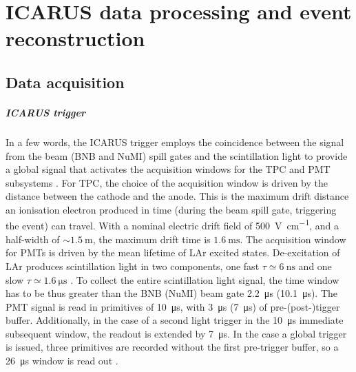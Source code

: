 
\chapter{ICARUS data processing and event reconstruction}
\label{chap:event_reconstruction}




\section{Data acquisition} \label{sec:DAQ}


\paragraph{ICARUS trigger} In a few words, the ICARUS trigger employs the coincidence between the signal from the beam (BNB and NuMI) spill gates and the scintillation light to provide a global signal that activates  the acquisition windows for the TPC and PMT subsystems \cite{ICARUS:2025kai}. For TPC, the choice of the acquisition window is driven by the distance between the cathode and the anode. This is the maximum drift distance an ionisation electron produced in time (during the beam spill gate, triggering the event) can travel. With a nominal electric drift field of \SI{500}{\volt\per\cm}, and a half-width of $\sim\SI{1.5}{\m}$, the maximum drift time is $\SI{1.6}{\ms}$. The acquisition window for PMTs is driven by the mean lifetime of LAr excited states. De-excitation of LAr produces scintillation light in two components, one fast $\tau\simeq \SI{6}{\ns}$ and one slow $\tau\simeq\SI{1.6}{\us}$ \cite{Segreto:2020qks}. To collect the entire scintillation light signal, the time window has to be thus greater than the BNB (NuMI) beam gate \SI{2.2}{\us} (\SI{10.1}{\us}). The PMT signal is read in primitives of \SI{10}{\us}, with \SI{3}{\us} (\SI{7}{\us}) of pre-(post-)tigger buffer.  Additionally, in the case of a second light trigger in the \SI{10}{\us} immediate subsequent window, the readout is extended by \SI{7}{\us}. In the case a global trigger is issued, three primitives are recorded without the first pre-trigger buffer, so a \SI{26}{\us} window is read out \cite{ICARUS:2025kai}. 

